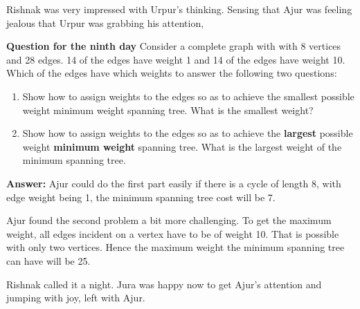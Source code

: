 Rishnak was very impressed with Urpur's thinking. Sensing that Ajur was feeling jealous that Urpur was grabbing his attention,

\textbf{Question for the ninth day}
Consider a complete graph with with 8 vertices and 28 edges. 14 of the edges have weight
1 and 14 of the edges have weight 10. Which of the edges have which weights to answer the
following  two questions: 
\begin{enumerate}
    \item Show how to assign weights to the edges so as to achieve the smallest possible weight minimum weight spanning tree. What is the smallest weight?
\item Show how to assign weights to the edges so as to achieve the \textbf{largest} possible weight \textbf{minimum weight} spanning tree. What is the largest weight of the minimum spanning tree.
 
\end{enumerate}

\textbf{Answer:} Ajur could do the first part easily if there is a cycle of length 8, with edge weight being 1, the minimum spanning tree cost will be 7.

Ajur found the second problem a bit more challenging. To get the maximum weight, all edges incident on a vertex have to be of weight 10. That is possible with only two vertices. Hence the maximum weight the minimum spanning tree can have will be 25.


 Rishnak called it a night. Jura was happy now to get Ajur's attention and jumping with joy, left with Ajur.